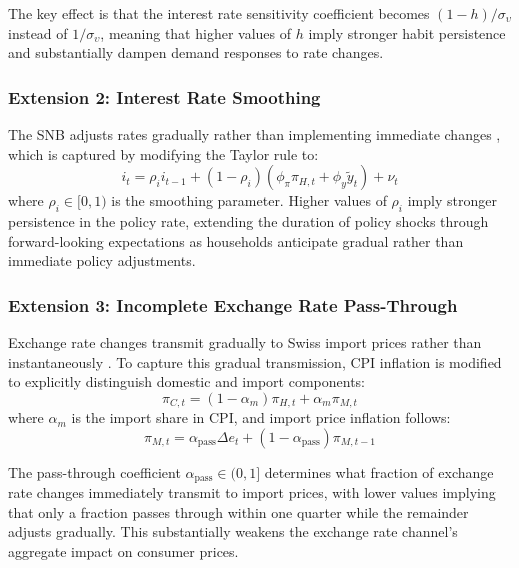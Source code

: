 \documentclass[12pt,a4paper]{article}
\begin{document}
The key effect is that the interest rate sensitivity coefficient becomes 
$(1-h)/\sigma_\upsilon$ instead of $1/\sigma_\upsilon$, meaning that higher values of $h$ imply stronger habit persistence and substantially dampen demand responses to rate changes.

\subsubsection{Extension 2: Interest Rate Smoothing}

The SNB adjusts rates gradually rather than implementing immediate changes 
\citep{cuchecurti2009}, which is captured by modifying the Taylor rule to:
\begin{equation}
	\boxed{i_t = \rho_i i_{t-1} + (1-\rho_i)(\phi_\pi\pi_{H,t} + \phi_y\tilde{y}_t) + \nu_t}
	\label{eq:Taylor_smooth}
\end{equation}
where $\rho_i \in [0,1)$ is the smoothing parameter. Higher values of $\rho_i$ 
imply stronger persistence in the policy rate, extending the duration of policy shocks through forward-looking expectations as households anticipate gradual rather than immediate policy adjustments.

\subsubsection{Extension 3: Incomplete Exchange Rate Pass-Through}

Exchange rate changes transmit gradually to Swiss import prices rather than 
instantaneously \citep{cuchecurti2009}. To capture this gradual transmission, 
CPI inflation is modified to explicitly distinguish domestic and import components:
\begin{equation}
	\boxed{\pi_{C,t} = (1-\alpha_m)\pi_{H,t} + \alpha_m\pi_{M,t}}
	\label{eq:CPI_incomplete}
\end{equation}
where $\alpha_m$ is the import share in CPI, and import price inflation follows:
\begin{equation}
	\boxed{\pi_{M,t} = \alpha_{\text{pass}}\Delta e_t + (1-\alpha_{\text{pass}})\pi_{M,t-1}}
	\label{eq:import_incomplete}
\end{equation}

The pass-through coefficient $\alpha_{\text{pass}} \in (0,1]$ determines what 
fraction of exchange rate changes immediately transmit to import prices, with 
lower values implying that only a fraction passes through within one quarter while the remainder adjusts gradually. This substantially weakens the exchange rate channel's aggregate impact on consumer prices.
\end{document}
